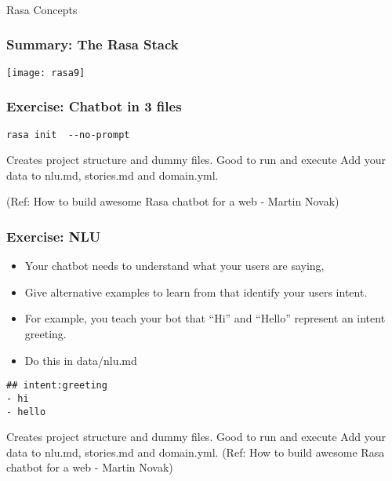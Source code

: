 \begin{frame}[fragile]\frametitle{}
\begin{center}
{\Large Rasa Concepts}

\end{center}
\end{frame}

 \begin{frame}[fragile]\frametitle{Summary: The Rasa Stack}

\begin{center}
\texttt{[image: rasa9]}
\end{center}



\end{frame}


 \begin{frame}[fragile]\frametitle{Exercise: Chatbot in 3 files}

\begin{lstlisting}
rasa init  --no-prompt
\end{lstlisting}

Creates project structure and dummy files. Good to run and execute
Add your data to nlu.md, stories.md and domain.yml.

{\tiny (Ref: How to build awesome Rasa chatbot for a web - Martin Novak)}

\end{frame}

 \begin{frame}[fragile]\frametitle{Exercise: NLU}

\begin{itemize}
\item Your chatbot needs to understand what your users are saying,
\item Give alternative examples to learn from that identify your users intent.
\item For example, you teach your bot that ``Hi'' and ``Hello'' represent an intent greeting. 
\item Do this in data/nlu.md
\end{itemize}


\begin{lstlisting}
## intent:greeting
- hi
- hello
\end{lstlisting}

Creates project structure and dummy files. Good to run and execute
Add your data to nlu.md, stories.md and domain.yml.
{\tiny (Ref: How to build awesome Rasa chatbot for a web - Martin Novak)}


\end{frame}


